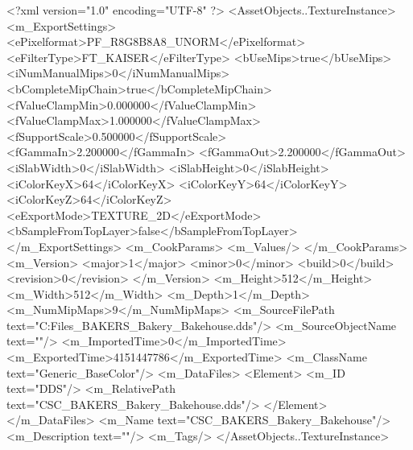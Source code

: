 <?xml version="1.0" encoding="UTF-8" ?>
<AssetObjects..TextureInstance>
	<m_ExportSettings>
		<ePixelformat>PF_R8G8B8A8_UNORM</ePixelformat>
		<eFilterType>FT_KAISER</eFilterType>
		<bUseMips>true</bUseMips>
		<iNumManualMips>0</iNumManualMips>
		<bCompleteMipChain>true</bCompleteMipChain>
		<fValueClampMin>0.000000</fValueClampMin>
		<fValueClampMax>1.000000</fValueClampMax>
		<fSupportScale>0.500000</fSupportScale>
		<fGammaIn>2.200000</fGammaIn>
		<fGammaOut>2.200000</fGammaOut>
		<iSlabWidth>0</iSlabWidth>
		<iSlabHeight>0</iSlabHeight>
		<iColorKeyX>64</iColorKeyX>
		<iColorKeyY>64</iColorKeyY>
		<iColorKeyZ>64</iColorKeyZ>
		<eExportMode>TEXTURE_2D</eExportMode>
		<bSampleFromTopLayer>false</bSampleFromTopLayer>
	</m_ExportSettings>
	<m_CookParams>
		<m_Values/>
	</m_CookParams>
	<m_Version>
		<major>1</major>
		<minor>0</minor>
		<build>0</build>
		<revision>0</revision>
	</m_Version>
	<m_Height>512</m_Height>
	<m_Width>512</m_Width>
	<m_Depth>1</m_Depth>
	<m_NumMipMaps>9</m_NumMipMaps>
	<m_SourceFilePath text="C:\Users\Shadow\Desktop\Working Files\Textures\CSC_BAKERS_Bakery_Bakehouse.dds"/>
	<m_SourceObjectName text=""/>
	<m_ImportedTime>0</m_ImportedTime>
	<m_ExportedTime>4151447786</m_ExportedTime>
	<m_ClassName text="Generic_BaseColor"/>
	<m_DataFiles>
		<Element>
			<m_ID text="DDS"/>
			<m_RelativePath text="CSC_BAKERS_Bakery_Bakehouse.dds"/>
		</Element>
	</m_DataFiles>
	<m_Name text="CSC_BAKERS_Bakery_Bakehouse"/>
	<m_Description text=""/>
	<m_Tags/>
</AssetObjects..TextureInstance>

